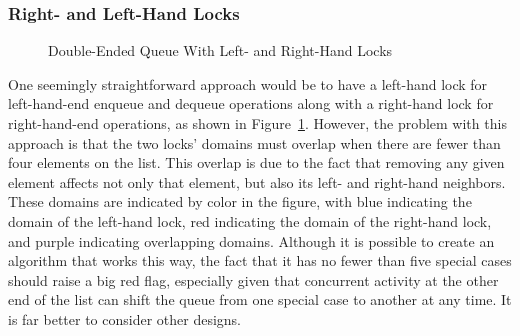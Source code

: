 \subsubsection{Right- and Left-Hand Locks}
\label{sec:SMPdesign:Right- and Left-Hand Locks}

\begin{figure}[tb]
\begin{center}
\end{center}
\caption{Double-Ended Queue With Left- and Right-Hand Locks}
\label{fig:SMPdesign:Double-Ended Queue With Left- and Right-Hand Locks}
\end{figure}

One seemingly straightforward approach would be to have a left-hand lock
for left-hand-end enqueue and dequeue operations along with a right-hand
lock for right-hand-end operations, as shown in
Figure~\ref{fig:SMPdesign:Double-Ended Queue With Left- and Right-Hand Locks}.
However, the problem with this approach is that the two locks'
domains must overlap when there are fewer than four elements on the
list.
This overlap is due to the fact that removing any given element affects
not only that element, but also its left- and right-hand neighbors.
These domains are indicated by color in the figure, with blue indicating
the domain of the left-hand lock, red indicating the domain of the right-hand
lock, and purple indicating overlapping domains.
Although it is possible to create an algorithm that works this way,
the fact that it has no fewer than five special cases should raise
a big red flag, especially given that concurrent activity at the other
end of the list can shift the queue from one special case to another
at any time.
It is far better to consider other designs.

